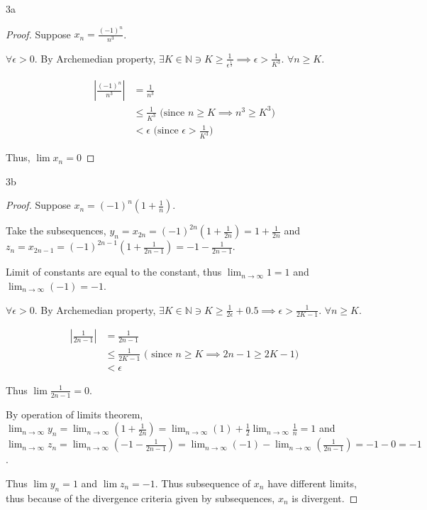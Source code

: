 \documentclass{article}
\newcommand{\N}{\mathbb{N}}
\newcommand{\abs}[1]{\left\lvert #1\right\rvert}
\begin{document}
\bigskip

\begin{PROB}{3a}\label{Problem 3a.}
\end{PROB}
\begin{proof}
    Suppose $x_n = \frac{(-1)^n}{n^3}$. 
    
    $\forall \epsilon > 0$. By Archemedian property, $\exists K \in \N \ni K \geq \frac{1}{\epsilon^{\frac{1}{3}}} \implies \epsilon > \frac{1}{K^3}$. $\forall n \geq K$. 
    
    \begin{align*}
        \abs{\frac{(-1)^n}{n^3}} &= \frac{1}{n^3} \\ 
        &\leq \frac{1}{K^3} \text{ (since $n \geq K \implies n^3 \geq K^3$)} \\
        &< \epsilon \text{ (since $\epsilon > \frac{1}{K^3}$)}
    \end{align*}

    Thus, $\lim x_n = 0$ 
\end{proof}

\bigskip

\begin{PROB}{3b}\label{Problem 3b.}
\end{PROB}
\begin{proof}
    Suppose $x_n = (-1)^n(1 + \frac{1}{n})$. 

    Take the subsequences, $y_n = x_{2n} = (-1)^{2n}(1 + \frac{1}{2n}) = 1 + \frac{1}{2n}$ and $z_n = x_{2n - 1} = (-1)^{2n - 1}(1 + \frac{1}{2n - 1}) = -1 -\frac{1}{2n - 1}$.

    Limit of constants are equal to the constant, thus $\lim_{n \to \infty} 1 = 1$ and $\lim_{n \to \infty} (-1) = -1$.
    
    
    $\forall \epsilon > 0$. By Archemedian property, $\exists K \in \N \ni K \geq \frac{1}{2\epsilon} + 0.5 \implies \epsilon > \frac{1}{2K - 1}$. $\forall n \geq K$.

    \begin{align*}
        \abs{\frac{1}{2n - 1}} &= \frac{1}{2n - 1} \\
        &\leq \frac{1}{2K - 1} \text{ ( since $n \geq K \implies 2n - 1 \geq 2K - 1$)} \\
        &< \epsilon 
    \end{align*}

    Thus $\lim \frac{1}{2n - 1} = 0$. 
    
    By operation of limits theorem, $\lim_{n \to \infty} y_n = \lim_{n \to \infty}(1 + \frac{1}{2n}) = \lim_{n \to \infty}(1) + \frac{1}{2}\lim_{n \to \infty}\frac{1}{n} = 1$ and $\lim_{n \to \infty} z_n = \lim_{n \to \infty}(-1 - \frac{1}{2n - 1}) = \lim_{n \to \infty}(-1)- \lim_{n \to \infty}(\frac{1}{2n - 1}) = -1 - 0 = -1$.
    
    Thus $\lim y_n = 1$ and $\lim z_n = -1$. Thus subsequence of $x_n$ have different limits, thus because of the divergence criteria given by subsequences, $x_n$ is divergent.      
\end{proof}
\end{document}
